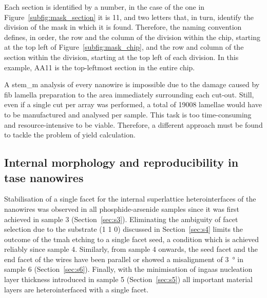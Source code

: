 Each section is identified by a number, in the case of the one in Figure~\ref{subfig:mask_section} it is \num{11}, and two letters that, in turn, identify the division of the mask in which it is found. Therefore, the naming convention defines, in order, the row and the column of the division within the chip, starting at the top left of Figure~\ref{subfig:mask_chip}, and the row and column of the section within the division, starting at the top left of each division. In this example, AA11 is the top-leftmost section in the entire chip.

A \acs{stem_m} analysis of every nanowire is impossible due to the damage caused by \acf{fib} lamella preparation to the area immediately surrounding each cut-out. Still, even if a single cut per array was performed, a total of \num{19008} lamellae would have to be manufactured and analysed per sample. This task is too time-consuming and resource-intensive to be viable. Therefore, a different approach must be found to tackle the problem of yield calculation.

\subsection{\texorpdfstring{Internal morphology and reproducibility in \acs{tase} nanowires}{Internal morphology and reproducibility in TASE nanowires}}

Stabilisation of a single  facet for the internal superlattice heterointerfaces of the nanowires was observed in all phosphide-arsenide samples since it was first achieved in sample 3 (Section~\ref{sec:s3}). Eliminating the ambiguity of facet selection due to the substrate \hkl(1 1 0) discussed in Section~\ref{sec:s4} limits the outcome of the \acf{tmah} etching to a single facet seed, a condition which is achieved reliably since sample 4. Similarly, from sample 4 onwards, the seed facet and the end facet of the wires have been parallel or showed a misalignment of \qty{3}{\degree} in sample 6 (Section~\ref{sec:s6}). Finally, with the minimisation of \acf{ingaas} nucleation layer thickness introduced in sample 5 (Section~\ref{sec:s5}) all important material layers are heterointerfaced with a single  facet.

